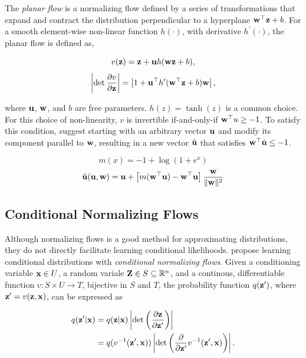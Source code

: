 \documentclass[twoside]{article}
\begin{document}
The \emph{planar flow} is a normalizing flow defined by a series of
transformations that expand and contract the distribution perpendicular to a
hyperplane \(\mathbf{w}^\top \textbf{z}  + b\). For a smooth element-wise non-linear
function \(h(\cdot)\), with derivative \(h^\prime(\cdot)\), the planar flow is
defined as,

\begin{equation}
  v(\textbf{z}) = \textbf{z} + \mathbf{u} h(\mathbf{w} \textbf{z} + b),
\end{equation}
\begin{equation}
  \left\lvert \det \frac{\partial v}{\partial \textbf{z}} \right\rvert =
  \left\lvert 1 + \mathbf{u}^\top h^\prime(\mathbf{w}^\top \textbf{z} + b) \mathbf{w} \right\rvert,
\end{equation}

\noindent
where \(\mathbf{u}\), \(\mathbf{w}\), and \(b\) are free parameters.
\(h(z) = \tanh(z)\) is a common choice. For this choice of non-linearity,
\(v\) is invertible if-and-only-if \(\mathbf{w}^\top u \geq -1\). To satisfy this
condition, \citet{rezende15} suggest starting with an arbitrary vector
\(\mathbf{u}\) and modify its component parallel to \(\mathbf{w}\), resulting in a new
vector \(\hat{\mathbf{u}}\) that satisfies \(\mathbf{w}^\top \hat{\mathbf{u}} \leq -1\).

\begin{equation*}
  m(x) = -1 + \log{(1 + e^x)}
\end{equation*}
\begin{equation}
  \hat{\mathbf{u}}(\mathbf{u}, \mathbf{w}) = \mathbf{u} + \left[m(\mathbf{w}^\top \mathbf{u}) -
  \mathbf{w}^\top \mathbf{u} \right] \frac{\mathbf{w}}{\lVert\mathbf{w}\rVert^2}
\end{equation}

\subsection{Conditional Normalizing Flows} \label{sec:cnf}
Although normalizing flows is a good method for approximating distributions,
they do not directly facilitate learning conditional likelihoods.
\citet{winkler19} propose learning conditional distributions with
\emph{conditional normalizing flows}. Given a conditioning variable
\(\textbf{x} \in U\), a random variale \(\textbf{Z} \in S \subseteq \mathbb{R}^n\), and a continous,
differentiable function \(v : S \times U \rightarrow T\), bijective in \(S\) and
\(T\), the probability function \(q(\textbf{z}^\prime)\), where
\(\textbf{z}^\prime = v(\textbf{z}, \textbf{x})\), can be expressed as

\begin{align}
  q(\textbf{z}^\prime \vert \textbf{x}) &= q(\textbf{z} \vert \textbf{x}) \left\lvert \det
  \left( \frac{\partial \textbf{z}}{\partial \textbf{z}^\prime} \right) \right\rvert
  \nonumber\\
  &= q(v^{-1}(\textbf{z}^\prime, \textbf{x})) \left\lvert \det \left( \frac{\partial}
  {\partial \textbf{z}^\prime} v^{-1}(\textbf{z}^\prime, \textbf{x}) \right) \right\rvert.
  \label{eq:cond_change_var_form1}
\end{align}
\end{document}

